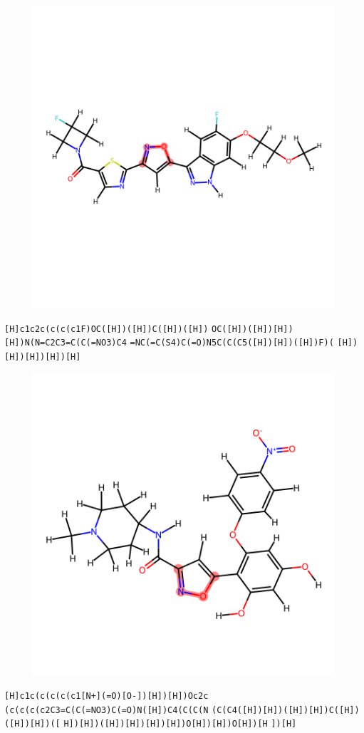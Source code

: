 \documentclass{article}
\begin{document}
\begin{figure}[ht]
\centering
    \includegraphics{mol256.png}
\end{figure}
\verb|[H]c1c2c(c(c(c1F)OC([H])([H])C([H])([H])| \verb|OC([H])([H])[H])[H])N(N=C2C3=C(C(=NO3)C4| \verb|=NC(=C(S4)C(=O)N5C(C(C5([H])[H])([H])F)(| \verb|[H])[H])[H])[H])[H]|

\begin{figure}[ht]
\centering
    \includegraphics{mol257.png}
\end{figure}
\verb|[H]c1c(c(c(c(c1[N+](=O)[O-])[H])[H])Oc2c| \verb|(c(c(c(c2C3=C(C(=NO3)C(=O)N([H])C4(C(C(N| \verb|(C(C4([H])[H])([H])[H])C([H])([H])[H])([| \verb|H])[H])([H])[H])[H])[H])O[H])[H])O[H])[H| \verb|])[H]|
\end{document}
